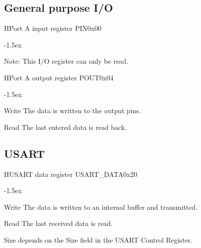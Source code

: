 \documentclass[12pt]{article}
\begin{document}
\subsection{General purpose I/O}

\begin{register}{H}{Port A input register PIN}{0x00}%
\label{pinx}%
\regnewline%
\end{register}
\begin{regdesc}[0.6\textwidth]\begin{reglist}[000000000]
\itemsep-1.5ex
\item[Note:] This I/O register can only be read.
\end{reglist}\end{regdesc}

\begin{register}{H}{Port A output register POUT}{0x04}%
\label{poutx}%
\regnewline%
\end{register}
\begin{regdesc}[0.6\textwidth]\begin{reglist}[000000000]
\itemsep-1.5ex
\item[Write] The data is written to the output pins.
\item[Read] The last entered data is read back.
\end{reglist}\end{regdesc}

\subsection{USART}

\begin{register}{H}{USART data register USART\_DATA}{0x20}
\label{usartdata}
%
%
\regnewline%
\end{register}
\begin{regdesc}[0.6\textwidth]\begin{reglist}[000000000]
\itemsep-1.5ex
\item[Write] The data is written to an internal buffer and transmitted.
\item[Read] The last received data is read.
\end{reglist}\end{regdesc}
\hspace*{2cm}Size depends on the Size field in the USART Control Register.
\end{document}

